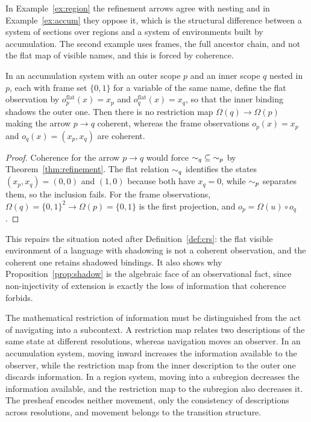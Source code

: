 In Example~\ref{ex:region} the refinement arrows agree with nesting and in Example~\ref{ex:accum} they oppose it, which is the structural difference between a system of sections over regions and a system of environments built by accumulation. The second example uses frames, the full ancestor chain, and not the flat map of visible names, and this is forced by coherence.

\begin{proposition}\label{prop:flat}
In an accumulation system with an outer scope $p$ and an inner scope $q$ nested in $p$, each with frame set $\{0,1\}$ for a variable of the same name, define the flat observation by $o^{\mathrm{flat}}_p(x)=x_p$ and $o^{\mathrm{flat}}_q(x)=x_q$, so that the inner binding shadows the outer one. Then there is no restriction map $\Omega(q)\to\Omega(p)$ making the arrow $p\to q$ coherent, whereas the frame observations $o_p(x)=x_p$ and $o_q(x)=(x_p,x_q)$ are coherent.
\end{proposition}
\begin{proof}
Coherence for the arrow $p\to q$ would force ${\sim_q}\subseteq{\sim_p}$ by Theorem~\ref{thm:refinement}. The flat relation $\sim_q$ identifies the states $(x_p,x_q)=(0,0)$ and $(1,0)$ because both have $x_q=0$, while $\sim_p$ separates them, so the inclusion fails. For the frame observations, $\Omega(q)=\{0,1\}^2\to\Omega(p)=\{0,1\}$ is the first projection, and $o_p=\Omega(u)\circ o_q$.
\end{proof}

This repairs the situation noted after Definition~\ref{def:crs}: the flat visible environment of a language with shadowing is not a coherent observation, and the coherent one retains shadowed bindings. It also shows why Proposition~\ref{prop:shadow} is the algebraic face of an observational fact, since non-injectivity of extension is exactly the loss of information that coherence forbids.

The mathematical restriction of information must be distinguished from the act of navigating into a subcontext. A restriction map relates two descriptions of the same state at different resolutions, whereas navigation moves an observer. In an accumulation system, moving inward increases the information available to the observer, while the restriction map from the inner description to the outer one discards information. In a region system, moving into a subregion decreases the information available, and the restriction map to the subregion also decreases it. The presheaf encodes neither movement, only the consistency of descriptions across resolutions, and movement belongs to the transition structure.

